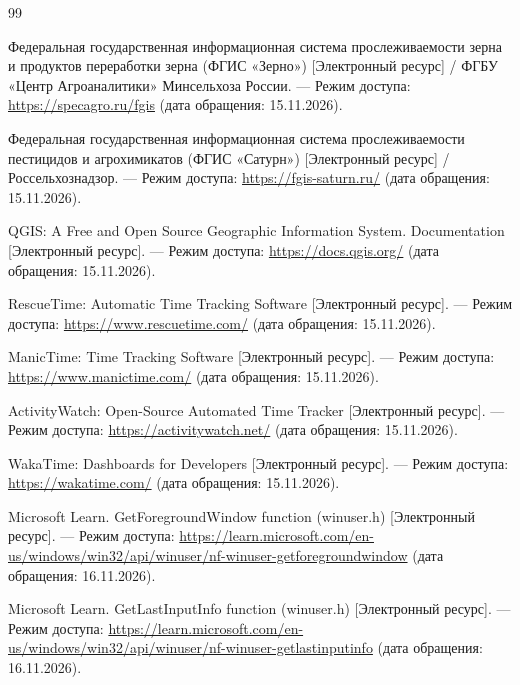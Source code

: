 \documentclass{timcw}
\begin{document}
\clearpage
\centeredrefname
{}
\begin{thebibliography}{99}

Федеральная государственная информационная система прослеживаемости зерна и продуктов переработки зерна (ФГИС «Зерно») [Электронный ресурс] / ФГБУ «Центр Агроаналитики» Минсельхоза России. --- Режим доступа: \url{https://specagro.ru/fgis} (дата обращения: 15.11.2026).

Федеральная государственная информационная система прослеживаемости пестицидов и агрохимикатов (ФГИС «Сатурн») [Электронный ресурс] / Россельхознадзор. --- Режим доступа: \url{https://fgis-saturn.ru/} (дата обращения: 15.11.2026).

QGIS: A Free and Open Source Geographic Information System. Documentation [Электронный ресурс]. --- Режим доступа: \url{https://docs.qgis.org/} (дата обращения: 15.11.2026).

RescueTime: Automatic Time Tracking Software [Электронный ресурс]. --- Режим доступа: \url{https://www.rescuetime.com/} (дата обращения: 15.11.2026).

ManicTime: Time Tracking Software [Электронный ресурс]. --- Режим доступа: \url{https://www.manictime.com/} (дата обращения: 15.11.2026).

ActivityWatch: Open-Source Automated Time Tracker [Электронный ресурс]. --- Режим доступа: \url{https://activitywatch.net/} (дата обращения: 15.11.2026).

WakaTime: Dashboards for Developers [Электронный ресурс]. --- Режим доступа: \url{https://wakatime.com/} (дата обращения: 15.11.2026).

Microsoft Learn. GetForegroundWindow function (winuser.h) [Электронный ресурс]. --- Режим доступа: \url{https://learn.microsoft.com/en-us/windows/win32/api/winuser/nf-winuser-getforegroundwindow} (дата обращения: 16.11.2026).

Microsoft Learn. GetLastInputInfo function (winuser.h) [Электронный ресурс]. --- Режим доступа: \url{https://learn.microsoft.com/en-us/windows/win32/api/winuser/nf-winuser-getlastinputinfo} (дата обращения: 16.11.2026).


\end{thebibliography}
\end{document}
